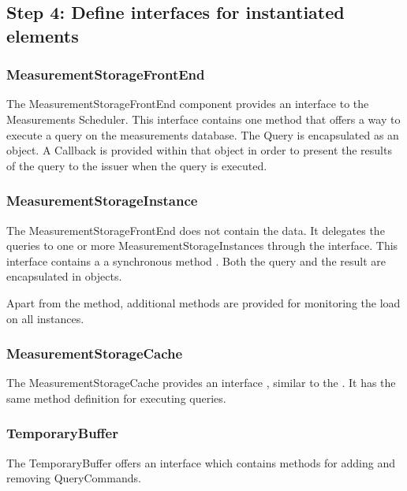 \subsection{Step 4: Define interfaces for instantiated elements}
\label{add:it4/interfaces}

\subsubsection{MeasurementStorageFrontEnd}

\npar The MeasurementStorageFrontEnd component provides an interface
 to the Measurements Scheduler. This interface
contains one method  that offers a way
to execute a query on the measurements database. The Query is encapsulated as an
object. A Callback is provided within that object in order to present the
results of the query to the issuer when the query is executed.

\subsubsection{MeasurementStorageInstance}

\npar The MeasurementStorageFrontEnd does not contain the data. It delegates
the queries to one or more MeasurementStorageInstances through the
 interface. This interface contains a
a synchronous method . Both the query and the
result are encapsulated in objects.

\npar Apart from the  method, additional methods are provided
for monitoring the load on all instances.

\subsubsection{MeasurementStorageCache}

\npar The MeasurementStorageCache provides an interface
, similar to the
. It has the same method definition for
executing queries. 

\subsubsection{TemporaryBuffer}

\npar The TemporaryBuffer offers an  interface
which contains methods for adding and removing QueryCommands. 

